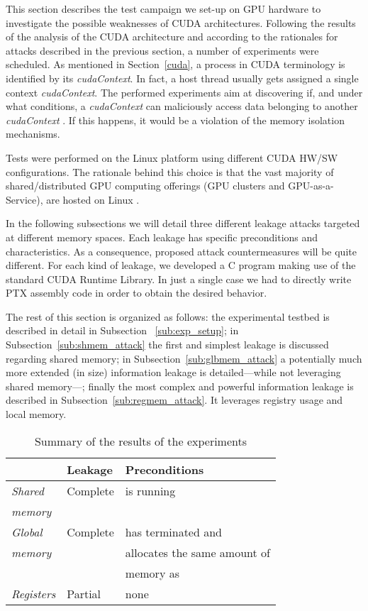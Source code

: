 \documentclass[11pt,onecolumn,letterpaper]{IEEEtran}
\begin{document}
This section describes the test campaign we set-up on GPU hardware to investigate the possible weaknesses of CUDA architectures.
Following the results of the analysis of the CUDA architecture and according to the rationales for attacks described in the previous section,
a number of experiments were scheduled.
As mentioned in Section~\ref{cuda}, a process in CUDA terminology is identified by its \emph{cudaContext}.
In fact, a host thread  usually gets assigned a single context \emph{cudaContext}.
The performed experiments aim at discovering if, and under what conditions,
a \emph{cudaContext}   can maliciously access data belonging to another \emph{cudaContext} .
If this happens, it would be a violation of the memory isolation mechanisms.

Tests were performed on the Linux platform using different CUDA HW/SW configurations.
The rationale behind this choice is that the vast majority of shared/distributed GPU computing offerings (GPU clusters and GPU-as-a-Service), are hosted on Linux \cite{linuxinthecloud}.

In the following subsections we will detail three different leakage attacks targeted at different memory spaces.
Each leakage has specific preconditions and characteristics.
As a consequence, proposed attack countermeasures will be quite different.
For each kind of leakage, we developed a C program making use of the standard CUDA Runtime Library.
In just a single case we had to directly write PTX assembly code in order to obtain the desired behavior.

The rest of this section is organized as follows: the experimental testbed is described in detail in Subsection ~\ref{sub:exp_setup};
in Subsection~\ref{sub:shmem_attack} the first and simplest leakage is discussed regarding shared memory;
in Subsection~\ref{sub:glbmem_attack} a potentially much more extended (in size) information leakage is detailed---while not leveraging shared memory---;
finally the most complex and powerful information leakage is described in Subsection~\ref{sub:regmem_attack}.
It leverages registry usage and local memory.

\begin{center}
\begin{table}
	\centering
	\caption{Summary of the results of the experiments}
\begin{tabular}{| l | l | l |}
		\hline 
		& \textbf{Leakage} & \textbf{Preconditions} \\
		\hline \hline
		\textit{Shared} & Complete &  is running \\
		\textit{memory} &  &   \\\hline
		\textit{Global} & Complete  &  has terminated and   \\
		\textit{memory}	&           & allocates the same amount of\\
				&	    &  memory as  \\\hline
		\textit{Registers} & Partial & none \\\hline	 	 	
	\end{tabular}
	\smallskip
	\smallskip
\label{tab:test-summary}
\end{table}
\end{center}
\end{document}
